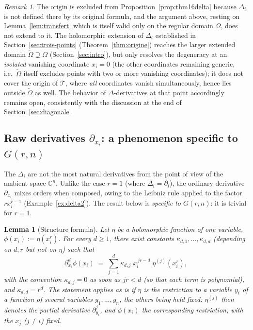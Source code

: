 \documentclass[11pt]{article}
\newtheorem{lemma}[theorem]{Lemma}
\theoremstyle{remark}
\newtheorem{remark}[theorem]{Remark}
\newcommand{\CC}{\mathbb{C}}
\begin{document}
\begin{remark}
The origin is excluded from Proposition~\ref{prop:thm16delta} because $\Delta_i$ is not defined there by its original formula, and the argument above, resting on Lemma~\ref{lem:transfert} which is itself valid only on the regular domain $\Omega$, does not extend to it. The holomorphic extension of $\Delta_i$ established in Section~\ref{sec:trois-points} (Theorem~\ref{thm:origine}) reaches the larger extended domain $\widetilde\Omega\supsetneq\Omega$ (Section~\ref{sec:intro}), but only resolves the degeneracy at an \emph{isolated} vanishing coordinate $x_i=0$ (the other coordinates remaining generic, i.e.\ $\widetilde\Omega$ itself excludes points with two or more vanishing coordinates); it does not cover the origin of $\mathcal T$, where \emph{all} coordinates vanish simultaneously, hence lies outside $\widetilde\Omega$ as well. The behavior of $\Delta$-derivatives at that point accordingly remains open, consistently with the discussion at the end of Section~\ref{sec:diagonale}.
\end{remark}

\subsection{Raw derivatives $\partial_{x_i}$: a phenomenon specific to $G(r,n)$}

The $\Delta_i$ are not the most natural derivatives from the point of view of the ambient space $\CC^n$. Unlike the case $r=1$ (where $\Delta_i=\partial_i$), the ordinary derivative $\partial_{x_i}$ mixes orders when composed, owing to the Leibniz rule applied to the factor $rx_i^{r-1}$ (Example~\ref{ex:delta2}). The result below is \emph{specific to $G(r,n)$}: it is trivial for $r=1$.

\begin{lemma}[Structure formula]\label{lem:faadibruno}
Let $\eta$ be a holomorphic function of one variable, $\phi(x_i):=\eta(x_i^r)$. For every $d\ge1$, there exist constants $\kappa_{d,1},\dots,\kappa_{d,d}$ (depending on $d,r$ but not on $\eta$) such that
\[
\partial_{x_i}^d\phi(x_i) \;=\; \sum_{j=1}^{d} \kappa_{d,j}\;x_i^{\,jr-d}\;\eta^{(j)}(x_i^r),
\]
with the convention $\kappa_{d,j}=0$ as soon as $jr<d$ (so that each term is polynomial), and $\kappa_{d,d}=r^d$. The statement applies as is if $\eta$ is the restriction to a variable $y_i$ of a function of several variables $y_1,\dots,y_n$, the others being held fixed: $\eta^{(j)}$ then denotes the partial derivative $\partial_{y_i}^j$, and $\phi(x_i)$ the corresponding restriction, with the $x_j$ ($j\ne i$) fixed.
\end{lemma}
\end{document}
